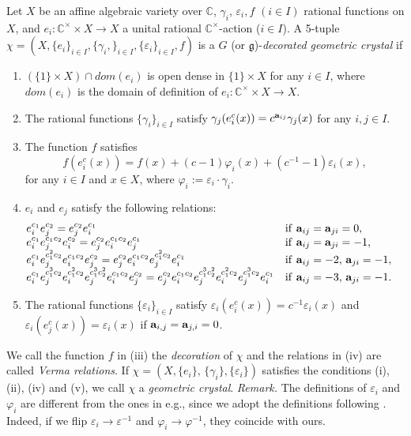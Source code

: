 \begin{df}
\label{def-gc}
Let $X$ be an affine algebraic variety over ${\mathbb C}$, 
$\gamma_i$, ${\varepsilon}_i, f$ 
$(i\in I)$ rational functions on $X$, and 
$e_i:{\mathbb C}^\times\times X\to X$ a unital rational ${\mathbb C}^\times$-action
($i\in I$).
A 5-tuple $\chi=(X,\{e_i\}_{i\in I},\{\gamma_i,\}_{i\in I},
\{{\varepsilon}_i\}_{i\in I},f)$ is a 
$G$ (or ${\mathfrak g}$)-{\it decorated geometric crystal} 
if
\begin{enumerate}
\item
$(\{1\}\times X)\cap dom(e_i)$ 
is open dense in $\{1\}\times X$ for any $i\in I$, where
$dom(e_i)$ is the domain of definition of
$e_i{\colon}{\mathbb C}^\times\times X\to X$.
\item
The rational functions  $\{\gamma_i\}_{i\in I}$ satisfy
$\gamma_j(e^c_i(x))=c^{{\bf a}_{ij}}\gamma_j(x)$ for any $i,j\in I$.
\item
The function $f$ satisfies
\begin{equation}
f(e_i^c(x))=f(x)+{(c-1){\varphi}_i(x)}+{(c^{-1}-1){\varepsilon}_i(x)},
\label{f}
\end{equation}
for any $i\in I$ and $x\in X$,  where ${\varphi}_i:={\varepsilon}_i\cdot\gamma_i$.
\item
$e_i$ and $e_j$ satisfy the following relations:
\[
 \begin{array}{lll}
&\hspace{-20pt}e^{c_1}_{i}e^{c_2}_{j}
=e^{c_2}_{j}e^{c_1}_{i}&
{\rm if }\,\,{\bf a}_{ij}={\bf a}_{ji}=0,\\
&\hspace{-20pt} e^{c_1}_{i}e^{c_1c_2}_{j}e^{c_2}_{i}
=e^{c_2}_{j}e^{c_1c_2}_{i}e^{c_1}_{j}&
{\rm if }\,\,{\bf a}_{ij}={\bf a}_{ji}=-1,\\
&\hspace{-20pt}
e^{c_1}_{i}e^{c^2_1c_2}_{j}e^{c_1c_2}_{i}e^{c_2}_{j}
=e^{c_2}_{j}e^{c_1c_2}_{i}e^{c^2_1c_2}_{j}e^{c_1}_{i}&
{\rm if }\,\,{\bf a}_{ij}=-2,\,
{\bf a}_{ji}=-1,\\
&\hspace{-20pt}
e^{c_1}_{i}e^{c^3_1c_2}_{j}e^{c^2_1c_2}_{i}
e^{c^3_1c^2_2}_{j}e^{c_1c_2}_{i}e^{c_2}_{j}
=e^{c_2}_{j}e^{c_1c_2}_{i}e^{c^3_1c^2_2}_{j}e^{c^2_1c_2}_{i}
e^{c^3_1c_2}_je^{c_1}_i&
{\rm if }\,\,{\bf a}_{ij}=-3,\,
{\bf a}_{ji}=-1.
\end{array}
\]
\item
The rational functions $\{{\varepsilon}_i\}_{i\in I}$ satisfy
${\varepsilon}_i(e_i^c(x))=c^{-1}{\varepsilon}_i(x)$ and 
${\varepsilon}_i(e_j^c(x))={\varepsilon}_i(x)$ if ${\bf a}_{i,j}={\bf a}_{j,i}=0$.
\end{enumerate}
\end{df}
We call the function $f$ in (iii) the {\it decoration} of $\chi$ and 
the relations in (iv) are called 
{\it Verma relations}.
If $\chi=(X,\{e_i\},\,\{\gamma_i\},\{{\varepsilon}_i\})$
satisfies the conditions (i), (ii), (iv) and (v), 
we call $\chi$ a {\it geometric crystal}.
{\sl Remark.}
The definitions of ${\varepsilon}_i$ and ${\varphi}_i$ are different from the ones in 
e.g., \cite{BK2} since we adopt the definitions following
\cite{KNO,KNO2}. Indeed, if we flip ${\varepsilon}_i\to {\varepsilon}^{-1}$ and 
${\varphi}_i\to {\varphi}^{-1}$, they coincide with ours.

